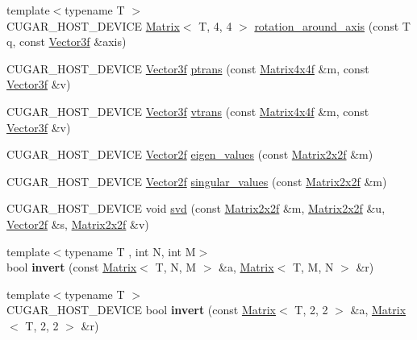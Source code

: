 \begin{DoxyCompactItemize}
\item 
{\footnotesize template$<$typename T $>$ }\\C\+U\+G\+A\+R\+\_\+\+H\+O\+S\+T\+\_\+\+D\+E\+V\+I\+CE \hyperlink{structcugar_1_1_matrix}{Matrix}$<$ T, 4, 4 $>$ \hyperlink{group___matrices_module_ga5aabd5a72dab7887d3c7f21a58f4fd2e}{rotation\+\_\+around\+\_\+axis} (const T q, const \hyperlink{structcugar_1_1_vector}{Vector3f} \&axis)
\item 
C\+U\+G\+A\+R\+\_\+\+H\+O\+S\+T\+\_\+\+D\+E\+V\+I\+CE \hyperlink{structcugar_1_1_vector}{Vector3f} \hyperlink{group___matrices_module_ga5402d493f98fbe0feb20442d4e15ca02}{ptrans} (const \hyperlink{structcugar_1_1_matrix}{Matrix4x4f} \&m, const \hyperlink{structcugar_1_1_vector}{Vector3f} \&v)
\item 
C\+U\+G\+A\+R\+\_\+\+H\+O\+S\+T\+\_\+\+D\+E\+V\+I\+CE \hyperlink{structcugar_1_1_vector}{Vector3f} \hyperlink{group___matrices_module_ga1e73a0b256562dbf294f67516fcce100}{vtrans} (const \hyperlink{structcugar_1_1_matrix}{Matrix4x4f} \&m, const \hyperlink{structcugar_1_1_vector}{Vector3f} \&v)
\item 
C\+U\+G\+A\+R\+\_\+\+H\+O\+S\+T\+\_\+\+D\+E\+V\+I\+CE \hyperlink{structcugar_1_1_vector}{Vector2f} \hyperlink{group___matrices_module_gac5e231e656dbe04b10efcd989ef39874}{eigen\+\_\+values} (const \hyperlink{structcugar_1_1_matrix}{Matrix2x2f} \&m)
\item 
C\+U\+G\+A\+R\+\_\+\+H\+O\+S\+T\+\_\+\+D\+E\+V\+I\+CE \hyperlink{structcugar_1_1_vector}{Vector2f} \hyperlink{group___matrices_module_gaa1e73bc6264dda2d9b49c2f172565382}{singular\+\_\+values} (const \hyperlink{structcugar_1_1_matrix}{Matrix2x2f} \&m)
\item 
C\+U\+G\+A\+R\+\_\+\+H\+O\+S\+T\+\_\+\+D\+E\+V\+I\+CE void \hyperlink{group___matrices_module_gab83521723618b3ffc4eb605cc2e0580f}{svd} (const \hyperlink{structcugar_1_1_matrix}{Matrix2x2f} \&m, \hyperlink{structcugar_1_1_matrix}{Matrix2x2f} \&u, \hyperlink{structcugar_1_1_vector}{Vector2f} \&s, \hyperlink{structcugar_1_1_matrix}{Matrix2x2f} \&v)
\item 
{\footnotesize template$<$typename T , int N, int M$>$ }\\bool {\bfseries invert} (const \hyperlink{structcugar_1_1_matrix}{Matrix}$<$ T, N, M $>$ \&a, \hyperlink{structcugar_1_1_matrix}{Matrix}$<$ T, M, N $>$ \&r)
\item 
\mbox{\label{namespacecugar_a6f7d6597ad2aafcc5cb04d19dd58bb79}} 
{\footnotesize template$<$typename T $>$ }\\C\+U\+G\+A\+R\+\_\+\+H\+O\+S\+T\+\_\+\+D\+E\+V\+I\+CE bool {\bfseries invert} (const \hyperlink{structcugar_1_1_matrix}{Matrix}$<$ T, 2, 2 $>$ \&a, \hyperlink{structcugar_1_1_matrix}{Matrix}$<$ T, 2, 2 $>$ \&r)

\end{DoxyCompactItemize}

